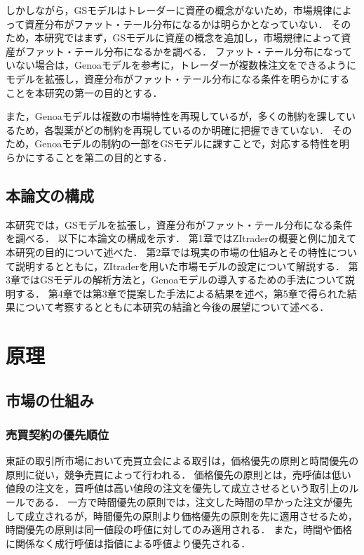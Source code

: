 \documentclass[titlepage]{jsreport}
\begin{document}
しかしながら，GSモデルはトレーダーに資産の概念がないため，市場規律によって資産分布がファット・テール分布になるかは明らかとなっていない．
そのため，本研究ではまず，GSモデルに資産の概念を追加し，市場規律によって資産がファット・テール分布になるかを調べる．
ファット・テール分布になっていない場合は，Genoaモデルを参考に，トレーダーが複数株注文をできるようにモデルを拡張し，資産分布がファット・テール分布になる条件を明らかにすることを本研究の第一の目的とする．

また，Genoaモデルは複数の市場特性を再現しているが，多くの制約を課しているため，各製薬がどの制約を再現しているのか明確に把握できていない．
そのため，Genoaモデルの制約の一部をGSモデルに課すことで，対応する特性を明らかにすることを第二の目的とする．


\section{本論文の構成}
本研究では，GSモデルを拡張し，資産分布がファット・テール分布になる条件を調べる．
以下に本論文の構成を示す．
第1章ではZItraderの概要と例に加えて本研究の目的について述べた．
第2章では現実の市場の仕組みとその特性について説明するとともに，ZItraderを用いた市場モデルの設定について解説する．
第3章ではGSモデルの解析方法と，Genoaモデルの導入するための手法について説明する．
第4章では第3章で提案した手法による結果を述べ，第5章で得られた結果について考察するとともに本研究の結論と今後の展望について述べる．

\chapter{原理} \label{chap:principle}

\section{市場の仕組み}
\subsection{売買契約の優先順位}
東証の取引所市場において売買立会による取引は，価格優先の原則と時間優先の原則に従い，競争売買によって行われる\cite{shokengaimuin}．
価格優先の原則とは，売呼値は低い値段の注文を，買呼値は高い値段の注文を優先して成立させるという取引上のルールである．
一方で時間優先の原則では，注文した時間の早かった注文が優先して成立されるが，時間優先の原則より価格優先の原則を先に適用させるため，時間優先の原則は同一値段の呼値に対してのみ適用される．
また，時間や価格に関係なく成行呼値は指値による呼値より優先される．
\end{document}
